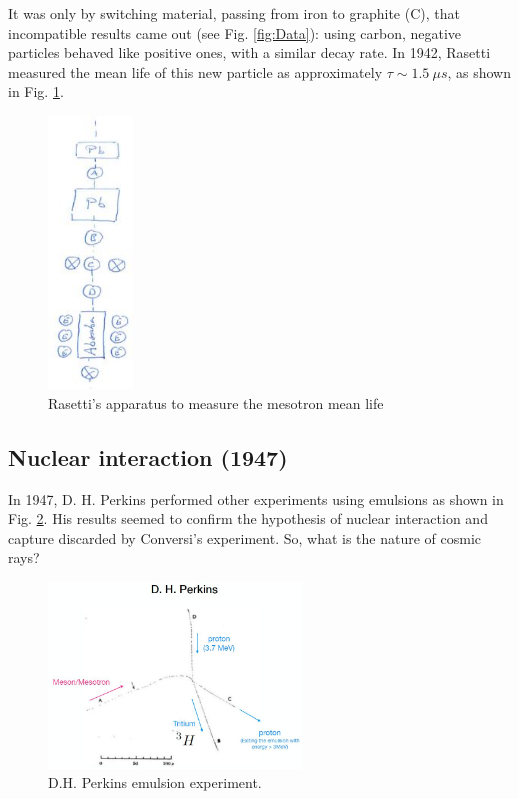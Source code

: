 It was only by switching material, passing from iron to graphite (C), that incompatible results came out (see Fig. \ref{fig:Data}): using carbon, negative particles behaved like positive ones, with a similar decay rate.
In 1942, Rasetti measured the mean life of this new particle as approximately $\tau \sim 1.5 \ \mu s$, as shown in Fig. \ref{fig:rasetti}.

\begin{figure}[!h]
    \centering
    \includegraphics[width=0.2\textwidth]{Figures/FNSN18_3.JPG}
    \caption{Rasetti's apparatus to measure the mesotron mean life}
    \label{fig:rasetti}
\end{figure} 
\clearpage

\subsection{Nuclear interaction (1947)}

In 1947, D. H. Perkins performed other experiments using emulsions as shown in Fig. \ref{fig:Perkins}. His results seemed to confirm the hypothesis of nuclear interaction and capture discarded by Conversi's experiment. So, what is the nature of cosmic rays? 

\begin{figure}[!h]
    \centering
    \includegraphics[width=0.6\textwidth]{Figures/FNSN18_8.JPG}
    \caption{D.H. Perkins emulsion experiment.}
    \label{fig:Perkins}
\end{figure} 

